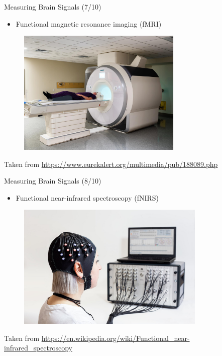 \documentclass{beamer}
\begin{document}
\begin{frame}
{\centerline{Measuring Brain Signals (7/10)}}
\begin{itemize}
    \item Functional magnetic resonance imaging (fMRI)
\end{itemize}
\begin{figure}
    \centering
    \includegraphics[height=6cm]{P2023.AIBCCSS.BrainSignals/fmri.jpg}
\end{figure}
\begin{center}
    \tiny{Taken from \url{https://www.eurekalert.org/multimedia/pub/188089.php}}
\end{center}    
\end{frame}

\begin{frame}
{\centerline{Measuring Brain Signals (8/10)}}
\begin{itemize}
    \item Functional near-infrared spectroscopy (fNIRS)
\end{itemize}
\begin{figure}
    \centering
    \includegraphics[height=6cm]{P2023.AIBCCSS.BrainSignals/fnirs.jpg}
\end{figure}
\begin{center}
    \tiny{Taken from \url{https://en.wikipedia.org/wiki/Functional_near-infrared_spectroscopy}}
\end{center}    
\end{frame}
\end{document}
